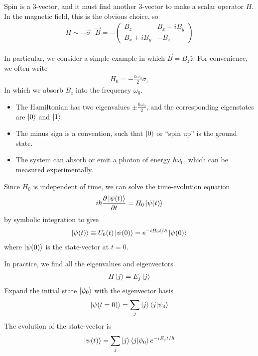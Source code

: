 Spin is a 3-vector, and it must find another 3-vector to make a scalar operator $H$. In the magnetic field, this is the obvious choice, so\begin{align*}
    H\sim -\vec{\sigma}\cdot\vec{B}=-\begin{pmatrix}
        B_z & B_x-iB_y\\ B_x+iB_y&-B_z
    \end{pmatrix}
\end{align*}

In particular, we consider a simple example in which $\vec{B}=B_z\hat{z}$. For convenience, we often write\begin{align*}
    H_0=-\frac{\hbar\omega_0}{2}\sigma_z
\end{align*}
In which we absorb $B_z$ into the frequency $\omega_0$. 
\begin{itemize}
    \item The Hamiltonian has two eigenvalues $\pm \frac{\hbar\omega_0}{2}$, and the corresponding eigenstates are $\ket{0}$ and $\ket{1}$. 
    \item The minus sign is a convention, such that $\ket{0}$ or ``spin up'' is the ground state.
    \item The system can absorb or emit a photon of energy $\hbar \omega_0$, which can be measured experimentally.
\end{itemize}

Since $H_0$ is independent of time, we can solve the time-evolution equation \begin{align*}
    i\hbar\frac{\partial \ket{\psi(t)}}{\partial t}=H_0\ket{\psi(t)}
\end{align*}
by symbolic integration to give 
\begin{align*}
    \ket{\psi(t)}\equiv U_0(t)\ket{\psi(0)}=e^{ -iH_0 t/\hbar }\ket{\psi(0)}
\end{align*}
where $\ket{\psi(0)}$ is the state-vector at $t=0$. 

In practice, we find all the eigenvalues and eigenvectors
\begin{align*}
    H\ket{j}=E_j\ket{j}
\end{align*}
Expand the initial state $\ket{\psi_0}$ with the eigenvector basis
\begin{align*}
    \ket{\psi(t=0)}=\sum_j\ket{j}\braket{j|\psi_0}
\end{align*}
The evolution of the state-vector is 
\begin{align*}
    \ket{\psi(t)}=\sum_j\ket{j}\braket{j|\psi_0}e^{-iE_jt/\hbar}
\end{align*}

